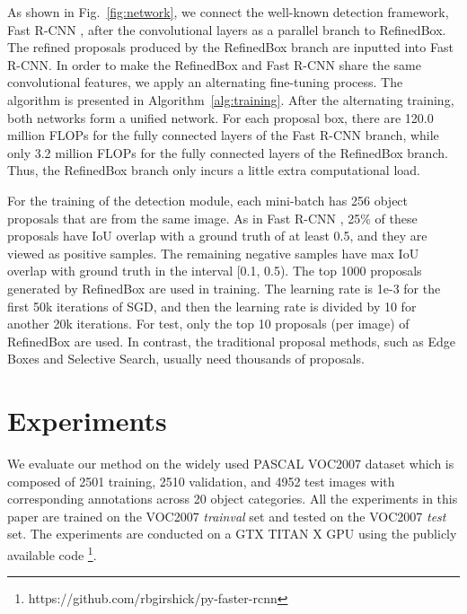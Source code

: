 \documentclass[10pt,twocolumn,letterpaper]{article}
\newcommand{\figref}[1]{Fig.~\ref{#1}}
\newcommand{\algref}[1]{Algorithm~\ref{#1}}
\begin{document}
As shown in \figref{fig:network}, we connect the well-known detection framework,
Fast R-CNN \cite{girshick2015fast}, after the convolutional layers as a parallel
branch to RefinedBox.
The refined proposals produced by the RefinedBox branch are inputted into Fast R-CNN.
%
In order to make the RefinedBox and Fast R-CNN share the same convolutional features,
we apply an alternating fine-tuning process.
The algorithm is presented in \algref{alg:training}.
After the alternating training, both networks form a unified network.
%
For each proposal box, there are 120.0 million FLOPs for the fully 
connected layers of the Fast R-CNN branch, while only 3.2 million 
FLOPs for the fully connected layers of the RefinedBox branch.
Thus, the RefinedBox branch only incurs a little extra computational load.


For the training of the detection module, each mini-batch has 256 
object proposals that are from the same image.
As in Fast R-CNN \cite{girshick2015fast}, 25\% of these proposals 
have IoU overlap with a ground truth of at least 0.5, and they are 
viewed as positive samples.
The remaining negative samples have max IoU overlap with ground truth
in the interval [0.1, 0.5).
The top 1000 proposals generated by RefinedBox are used in training.
The learning rate is 1e-3 for the first 50k iterations of SGD,
and then the learning rate is divided by 10 for another 20k iterations.
For test, only the top 10 proposals (per image) of RefinedBox are used.
In contrast, the traditional proposal methods, such as Edge Boxes and
Selective Search, usually need thousands of proposals.



\section{Experiments}
We evaluate our method on the widely used PASCAL VOC2007 dataset
\cite{pascal-voc-2007} which is composed of 2501 training, 2510 validation, and
4952 test images with corresponding annotations across 20 object categories.
All the experiments in this paper are trained on the VOC2007 \textit{trainval}
set and tested on the VOC2007 \textit{test} set.
The experiments are conducted on a GTX TITAN X GPU using the publicly
available code \footnote{https://github.com/rbgirshick/py-faster-rcnn}.
\end{document}
